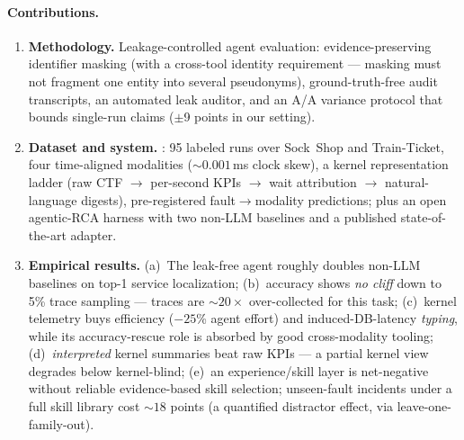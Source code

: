 \paragraph{Contributions.}
\begin{enumerate}
  \item \textbf{Methodology.} Leakage-controlled agent evaluation: evidence-preserving
  identifier masking (with a cross-tool identity requirement --- masking must not
  fragment one entity into several pseudonyms), ground-truth-free audit transcripts, an
  automated leak auditor, and an A/A variance protocol that bounds single-run claims
  ($\pm$9 points in our setting).
  \item \textbf{Dataset and system.} \sys: 95 labeled runs over Sock~Shop and
  Train-Ticket, four time-aligned modalities (${\sim}0.001$\,ms clock skew), a kernel
  representation ladder (raw CTF $\rightarrow$ per-second KPIs $\rightarrow$ wait
  attribution $\rightarrow$ natural-language digests), pre-registered
  fault$\rightarrow$modality predictions; plus an open agentic-RCA harness with two
  non-LLM baselines and a published state-of-the-art adapter.
  \item \textbf{Empirical results.} (a)~The leak-free agent roughly doubles non-LLM
  baselines on top-1 service localization; (b)~accuracy shows \emph{no cliff} down to
  5\% trace sampling --- traces are ${\sim}20\times$ over-collected for this task;
  (c)~kernel telemetry buys efficiency ($-25$\% agent effort) and induced-DB-latency
  \emph{typing}, while its accuracy-rescue role is absorbed by good cross-modality
  tooling; (d)~\emph{interpreted} kernel summaries beat raw KPIs --- a partial kernel
  view degrades below kernel-blind; (e)~an experience/skill layer is net-negative
  without reliable evidence-based skill selection; unseen-fault incidents under a full
  skill library cost ${\sim}18$ points (a quantified distractor effect, via
  leave-one-family-out).
\end{enumerate}

